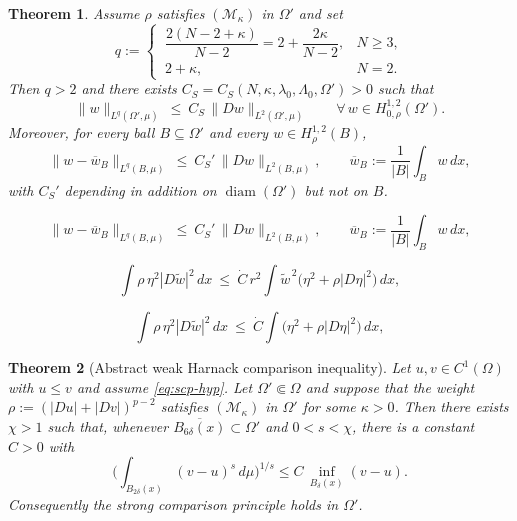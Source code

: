 \documentclass[10pt,a4paper]{amsart}
\newtheorem{theorem}{Theorem}
\begin{document}
\begin{theorem}\label{thm:sobolev}
Assume $\rho$ satisfies $(\mathcal M_\kappa)$ in $\Omega'$ and set
\begin{equation}\label{eq:qdef}
q:=\begin{cases}\ \dfrac{2(N-2+\kappa)}{N-2}=2+\dfrac{2\kappa}{N-2}, & N\ge3,\\[2mm]
\ 2+\kappa, & N=2 .\end{cases}
\end{equation}
Then $q>2$ and there exists $C_S=C_S(N,\kappa,\lambda_0,\Lambda_0,\Omega')>0$ such that
\begin{equation}\label{eq:sobolev}
\|w\|_{L^{q}(\Omega',\mu)}\ \le\ C_S\,\|Dw\|_{L^2(\Omega',\mu)}
\qquad\forall\,w\in H^{1,2}_{0,\rho}(\Omega') .
\end{equation}
Moreover, for every ball $B\subseteq\Omega'$ and every $w\in H^{1,2}_{\rho}(B)$,
\begin{equation}\label{eq:sobolev-mean}
\|w-\overline w_B\|_{L^{q}(B,\mu)}\ \le\ C_S'\,\|Dw\|_{L^2(B,\mu)},\qquad
\overline w_B:=\frac1{|B|}\int_Bw\,dx ,
\end{equation}
with $C_S'$ depending in addition on $\operatorname{diam}(\Omega')$ but not on $B$.
\end{theorem}

\begin{equation}
\|w-\overline w_B\|_{L^{q}(B,\mu)}\ \le\ C_S'\,\|Dw\|_{L^2(B,\mu)},\qquad
\overline w_B:=\frac1{|B|}\int_Bw\,dx ,
\end{equation}

\begin{equation}\label{eq:cacc-comp}
\int\rho\,\eta^2|D\widetilde w|^2\,dx\ \le\ \dot C\,r^2\int \widetilde w^{\,2}\big(\eta^2+\rho|D\eta|^2\big)\,dx ,
\end{equation}

\begin{equation}\label{eq:cacc-log}
\int\rho\,\eta^2|D\widetilde w|^2\,dx\ \le\ \dot C\int\big(\eta^2+\rho|D\eta|^2\big)\,dx ,
\end{equation}

\begin{theorem}[Abstract weak Harnack comparison inequality]\label{thm:abstract}
Let $u,v\in C^1(\Omega)$ with $u\le v$ and assume \eqref{eq:scp-hyp}. Let $\Omega'\Subset\Omega$ and
suppose that the weight $\rho:=(|Du|+|Dv|)^{p-2}$ satisfies $(\mathcal M_\kappa)$ in $\Omega'$ for
some $\kappa>0$. Then there exists $\chi>1$ such that, whenever
$\overline{B_{6\delta}(x)}\subset\Omega'$ and $0<s<\chi$, there is a constant $C>0$ with
\[
\Big(\int_{B_{2\delta}(x)}(v-u)^s\,d\mu\Big)^{1/s}\le C\,\inf_{B_{\delta}(x)}(v-u).
\]
Consequently the strong comparison principle holds in $\Omega'$.
\end{theorem}
\end{document}
